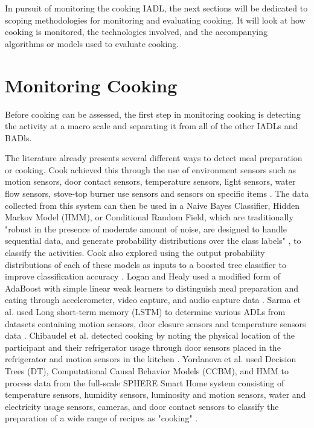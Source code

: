 In pursuit of monitoring the cooking IADL, the next sections will be dedicated to scoping methodologies for monitoring and evaluating cooking. It will look at how cooking is monitored, the technologies involved, and the accompanying algorithms or models used to evaluate cooking.

\section{Monitoring Cooking}
Before cooking can be assessed, the first step in monitoring cooking is detecting the activity at a macro scale and separating it from all of the other IADLs and BADls. 

The literature already presents several different ways to detect meal preparation or cooking. Cook achieved this through the use of environment sensors such as motion sensors, door contact sensors, temperature sensors, light sensors, water flow sensors, stove-top burner use sensors and sensors on specific items \cite{cook_learning_2010}. The data collected from this system can then be used in a Naive Bayes Classifier, Hidden Markov Model (HMM), or Conditional Random Field, which are traditionally "robust in the presence of moderate amount of noise, are designed to handle sequential data, and generate probability distributions over the class labels" \cite{cook_learning_2010}, to classify the activities. Cook also explored using the output probability distributions of each of these models as inputs to a boosted tree classifier to improve classification accuracy \cite{cook_learning_2010}. Logan and Healy used a modified form of AdaBoost with simple linear weak learners to distinguish meal preparation and eating through accelerometer, video capture, and audio capture data \cite{logan_sensors_2006}. Sarma et al. used Long short-term memory (LSTM) to determine various ADLs from datasets containing motion sensors, door closure sensors and temperature sensors data \cite{sarma_activity_2019}. Chibaudel et al. detected cooking by noting the physical location of the participant and their refrigerator usage through door sensors placed in the refrigerator and motion sensors in the kitchen \cite{mokhtari_smart_2018}. Yordanova et al. used Decision Trees (DT), Computational Causal Behavior Models (CCBM), and HMM to process data from the full-scale SPHERE Smart Home system consisting of temperature sensors, humidity sensors, luminosity and motion sensors, water and electricity usage sensors, cameras, and door contact sensors to classify the preparation of a wide range of recipes as "cooking" \cite{yordanova_analysing_2019}.

